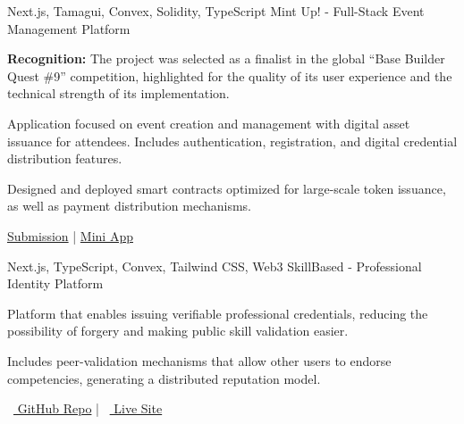 

\begin{cventries}

  \cventry
    {Next.js, Tamagui, Convex, Solidity, TypeScript} %
    {Mint Up! - Full-Stack Event Management Platform} %
    {} %
    {} %
    {
      \begin{cvitems} %
        \item {\textbf{Recognition:} The project was selected as a finalist in the global \textquotedblleft Base Builder Quest \#9\textquotedblright{} competition, highlighted for the quality of its user experience and the technical strength of its implementation.}
        \item {Application focused on event creation and management with digital asset issuance for attendees. Includes authentication, registration, and digital credential distribution features.}
        \item {Designed and deployed smart contracts optimized for large-scale token issuance, as well as payment distribution mechanisms.}
        \item {\faLink \href{https://devfolio.co/projects/mint-up-5d5d}{ Submission} \quad | \quad \faLink \href{https://farcaster.xyz/miniapps/jkuOonikCzn7/mint-up}{ Mini App}}
      \end{cvitems}
    }

  \vspace{6mm}

  \cventry
    {Next.js, TypeScript, Convex, Tailwind CSS, Web3} %
    {SkillBased - Professional Identity Platform} %
    {} %
    {} %
    {
      \begin{cvitems} %
        \item {Platform that enables issuing verifiable professional credentials, reducing the possibility of forgery and making public skill validation easier.}
        \item {Includes peer-validation mechanisms that allow other users to endorse competencies, generating a distributed reputation model.}
        \item {\faGithub\ \href{https://github.com/mavix21/SkillBased}{ GitHub Repo} \quad | \quad \faLink\ \href{https://skill-based.vercel.app/}{ Live Site}}
      \end{cvitems}
    }


\end{cventries}

